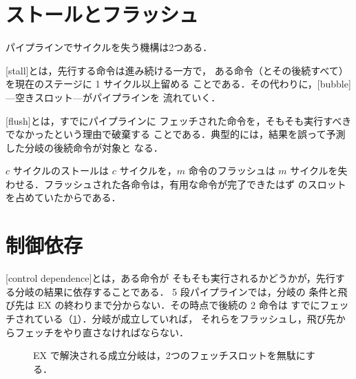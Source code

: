 \documentclass[../main.tex]{subfiles}
\begin{document}
\section{ストールとフラッシュ}

パイプラインでサイクルを失う機構は2つある．

\begin{definition}[ストール]
  [stall]とは，先行する命令は進み続ける一方で，
  ある命令（とその後続すべて）を現在のステージに 1 サイクル以上留める
  ことである．その代わりに，[bubble]---空きスロット---がパイプラインを
  流れていく．
\end{definition}

\begin{definition}[フラッシュ]
  [flush]とは，すでにパイプラインに
  フェッチされた命令を，そもそも実行すべきでなかったという理由で破棄する
  ことである．典型的には，結果を誤って予測した分岐の後続命令が対象と
  なる．
\end{definition}

$c$ サイクルのストールは $c$ サイクルを，$m$ 命令のフラッシュは $m$
サイクルを失わせる．フラッシュされた各命令は，有用な命令が完了できたはず
のスロットを占めていたからである．

\section{制御依存}

[control dependence]とは，ある命令が
そもそも実行されるかどうかが，先行する分岐の結果に依存することである．
5 段パイプラインでは，分岐の
条件と飛び先は EX の終わりまで分からない．その時点で後続の 2 命令は
すでにフェッチされている（\cref{fig:flush}）．分岐が成立していれば，
それらをフラッシュし，飛び先からフェッチをやり直さなければならない．

\begin{figure}[htbp]
  \centering
  
  \caption{EX で解決される成立分岐は，2つのフェッチスロットを無駄にする．}
  \label{fig:flush}
\end{figure}
\end{document}
